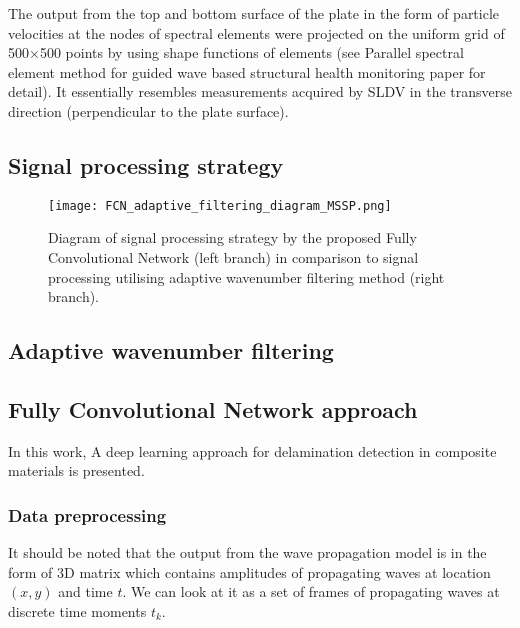 \documentclass[preprint,9pt]{elsarticle}
\begin{document}
	The output from the top and bottom surface of the plate in the form of particle velocities at the nodes of spectral elements were projected on the uniform grid of 500\(\times\)500 points by using shape functions of elements (see Parallel spectral element method for guided wave based structural health monitoring paper for detail).
	It essentially resembles measurements acquired by SLDV in the transverse direction (perpendicular to the plate surface).

	\subsection{Signal processing strategy}
	\begin{figure}
		\centering
		\texttt{[image: FCN\_adaptive\_filtering\_diagram\_MSSP.png]}
		\caption{Diagram of signal processing strategy by the proposed Fully Convolutional Network (left branch) in comparison to signal processing 	utilising adaptive wavenumber filtering method (right branch). }
		\label{fig:sig_proc_strategy}
	\end{figure}

	\subsection{Adaptive wavenumber filtering}

	\subsection{Fully Convolutional Network approach}
	In this work, A deep learning approach for delamination detection in composite materials is presented. 
	\subsubsection{Data preprocessing}
	It should be noted that the output from the wave propagation model is in the form of 3D matrix which contains amplitudes of propagating waves at location \((x, y)\) and time \(t\). We can look at it as a set of frames of propagating waves at discrete time moments \(t_k\).
\end{document}

